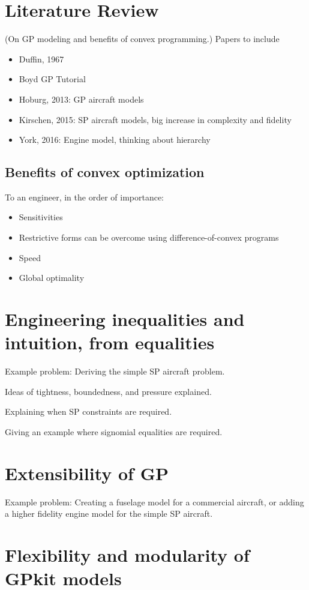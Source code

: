 \documentclass{aiaa-pretty}
\begin{document}
\section{Literature Review}
(On GP modeling and benefits of convex programming.)
Papers to include
\begin{itemize}
\item Duffin, 1967
\item Boyd GP Tutorial
\item Hoburg, 2013: GP aircraft models
\item Kirschen, 2015: SP aircraft models, big increase in complexity and fidelity
\item York, 2016: Engine model, thinking about hierarchy
\end{itemize}
\subsection{Benefits of convex optimization}
To an engineer, in the order of importance:
\begin{itemize}
\item Sensitivities
\item Restrictive forms can be overcome using difference-of-convex programs
\item Speed
\item Global optimality
\end{itemize}

\section{Engineering inequalities and intuition, from equalities}

Example problem: Deriving the simple SP aircraft problem. 

Ideas of tightness, boundedness, and pressure explained. 

Explaining when \gls{SP} constraints are required. 

Giving an example where signomial equalities are required. 

\section{Extensibility of \gls{GP}}

Example problem: Creating a fuselage model for a commercial aircraft, or adding a higher fidelity engine model for the simple SP aircraft. 

\section{Flexibility and modularity of GPkit models}
\end{document}
